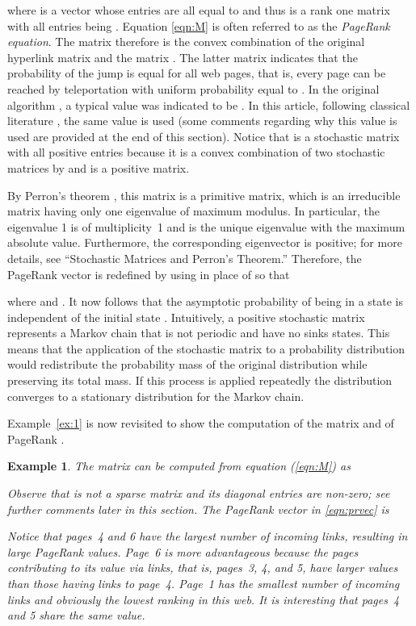 \documentclass[11pt,draftcls,onecolumn]{IEEEtran}
\newtheorem{example}[theorem]{Example}
\newcommand{\End}{\hfill \mbox{}}
\begin{document}
where  is a vector whose entries are all equal to  
and thus  is a rank one matrix with all entries being . 
Equation \eqref{eqn:M} is often referred to as the {\it PageRank equation}. The matrix  therefore 
is the convex combination of the original hyperlink matrix  and the matrix 
. The latter matrix indicates that the probability of the jump is equal for all web pages, 
that is, every page can be reached by teleportation with uniform probability equal to .
In the original algorithm \cite{BriPag:98}, 
a typical value was indicated to be . 
In this article, following classical literature \cite{LanMey:06},
the same value is used
(some comments regarding why this value is used are provided at the end of this section).
Notice that  is a stochastic matrix with all positive entries
because it is a convex combination of 
two stochastic matrices by  and  is a positive matrix.

By Perron's theorem \cite{HorJoh:85}, 
this matrix is a primitive matrix, 
which is an irreducible matrix having only one eigenvalue of maximum modulus.
In particular, the eigenvalue 1 is of multiplicity~1 and 
is the unique eigenvalue with the maximum absolute value. Furthermore,
the corresponding eigenvector is positive; 
for more details, see ``Stochastic Matrices and Perron's Theorem.''
Therefore, the PageRank vector  is redefined by using  in place of  so that

where  and . 
It now follows that the asymptotic probability  of being in a state is independent of the 
initial state . Intuitively, a positive stochastic matrix represents 
a Markov chain that is not periodic and have no sinks states.
This means that the application of the stochastic matrix to a probability 
distribution would redistribute the probability mass of the original distribution 
while preserving its total mass. If this process is applied repeatedly the distribution converges 
to a stationary distribution for the Markov chain.

Example~\ref{ex:1} is now revisited to show the computation 
of the matrix  and of PageRank .

\begin{example}\label{ex:2}\rm
The matrix  can be computed from equation (\ref{eqn:M}) as

Observe that  is not a sparse matrix and its diagonal entries are non-zero; 
see further comments later in this section.
The PageRank vector  in \eqref{eqn:prvec} is

Notice that pages~4 and 6 have the largest number of incoming links,
resulting in large PageRank values.
Page~6 is more advantageous because the pages contributing to its value
via links, that is, pages~3, 4, and 5, 
have larger values than those having links to page~4. 
Page~1 has the smallest number
of incoming links and obviously the lowest ranking in this web. 
It is interesting that pages~4 and 5 share the same value. 
\End
\end{example}
\end{document}
